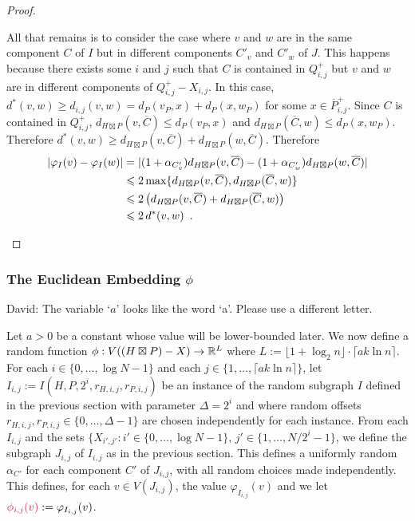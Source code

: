 \documentclass{patmorin}
\makeatletter
\renewcommand{\ge}{\geqslant}
\renewcommand{\le}{\leqslant}
\newcommand{\david}[1]{{\color{orange} David: #1}}
\def\mathcolor#1#{\@mathcolor{#1}}
\def\@mathcolor#1#2#3{%
  \protect\leavevmode
  \begingroup
    \color#1{#2}#3%
  \endgroup
}
\newcommand{\mathdefin}[1]{\mathcolor{brightmaroon}{#1}}
\makeatother
\begin{document}
\begin{proof}
\begin{compactenum}
    \item All that remains is to consider the case where $v$ and $w$ are in the same component $C$ of $I$ but in different components $C'_v$ and $C'_w$ of $J$.  This happens because there exists some $i$ and $j$ such that $C$ is contained in $Q^+_{i,j}$ but $v$ and $w$ are in different components of $Q^+_{i,j}-X_{i,j}$. In this case, $d^*(v,w)\ge d_{i,j}(v,w)=d_P(v_P,x)+d_P(x,w_P)$ for some $x\in \overline{P}^+_{i,j}$.  Since $C$ is contained in $Q^+_{i,j}$, $d_{H\boxtimes P}(v,\overline{C})\le d_{P}(v_P,x)$ and $d_{H\boxtimes P}(\overline{C},w)\le d_{P}(x,w_P)$. Therefore $d^*(v,w)\ge d_{H\boxtimes P}(v,\overline{C})+d_{H\boxtimes P}(w,\overline{C})$. Therefore
    \begin{align*}
        |\varphi_I(v)-\varphi_I(w)|
        & =|(1+\alpha_{C'_v})d_{H\boxtimes P}(v,\overline{C})-(1+\alpha_{C'_w})d_{H\boxtimes P}(w,\overline{C})| \\
        & \le 2\max\{d_{H\boxtimes P}(v,\overline{C}), d_{H\boxtimes P}(\overline{C},w)\} \\
        & \le 2\left(d_{H\boxtimes P}(v,\overline{C}) + d_{H\boxtimes P}(\overline{C},w)\right) \\
        & \le 2\, d^*(v,w) \enspace . \qedhere
    \end{align*}
  \end{compactenum}
\end{proof}


\subsubsection{\boldmath The Euclidean Embedding $\phi$}

\label{Euclidean_embedding_section}

\david{The variable `$a$' looks like the word `a'. Please use a different letter.}

Let $a>0$ be a constant whose value will be lower-bounded later.  We now define a random function $\phi:V((H\boxtimes P)-X)\to\mathbb{R}^{L}$ where $L:=\lfloor 1+\log_2 n\rfloor\cdot\lceil a k\ln n\rceil$. For each $i\in\{0,\ldots,\log N-1\}$ and each $j\in\{1,\ldots,\lceil a k\ln n\rceil\}$, let $I_{i,j}:=I(H,P,2^i,r_{H,i,j},r_{P,i,j})$ be an instance of the random subgraph $I$ defined in the previous section with parameter $\Delta=2^i$ and where random offsets $r_{H,i,j},r_{P,i,j}\in\{0,\ldots,\Delta-1\}$ are chosen independently for each instance.  From each $I_{i,j}$ and the sets $\{X_{i',j'}:i'\in\{0,\ldots,\log N-1\},\, j'\in\{1,\ldots,N/2^i-1\}$, we  define the subgraph $J_{i,j}$ of $I_{i,j}$ as in the previous section.  This defines a uniformly random $\alpha_{C'}$ for each component $C'$ of $J_{i,j}$, with all random choices made independently.  This defines, for each $v\in V(J_{i,j})$, the value $\varphi_{I_{i,j}}(v)$ and we let $\mathdefin{\phi_{i,j}(v)}:= \varphi_{I_{i,j}}(v)$.
\end{document}
